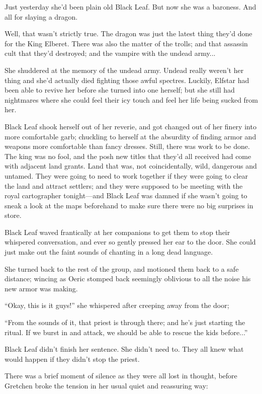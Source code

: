 {Just yesterday she’d been plain old Black Leaf. But now she was a baroness. And all for slaying a dragon.

\newpage

Well, that wasn’t strictly true. The dragon was just the latest thing they’d done for the King Elberet. There was also the matter of the trolls; and that assassin cult that they’d destroyed; and the vampire with the undead army...

She shuddered at the memory of the undead army. Undead really weren’t her thing and she’d actually died fighting those awful spectres. Luckily, Elfstar had been able to revive her before she turned into one herself; but she still had nightmares where she could feel their icy touch and feel her life being sucked from her.

Black Leaf shook herself out of her reverie, and got changed out of her finery into more comfortable garb; chuckling to herself at the absurdity of finding armor and weapons more comfortable than fancy dresses. Still, there was work to be done. The king was no fool, and the posh new titles that they’d all received had come with adjacent land grants. Land that was, not coincidentally, wild, dangerous and untamed. They were going to need to work together if they were going to clear the land and attract settlers; and they were supposed to be meeting with the royal cartographer tonight—and Black Leaf was damned if she wasn’t going to sneak a look at the maps beforehand to make sure there were no big surprises in store.

Black Leaf waved frantically at her companions to get them to stop their whispered conversation, and ever so gently pressed her ear to the door. She could just make out the faint sounds of chanting in a long dead language.

She turned back to the rest of the group, and motioned them back to a safe distance; wincing as Oeric stomped back seemingly oblivious to all the noise his new armor was making.

“Okay, this is it guys!” she whispered after creeping away from the door;

“From the sounds of it, that priest is through there; and he’s just starting the ritual. If we burst in and attack, we should be able to rescue the kids before...”

Black Leaf didn’t finish her sentence. She didn’t need to. They all knew what would happen if they didn’t stop the priest.

There was a brief moment of silence as they were all lost in thought, before Gretchen broke the tension in her usual quiet and reassuring way:

}

